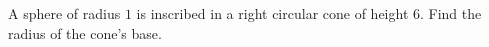 A sphere of radius $1$ is inscribed in a right circular cone of height $6$. Find the radius of the cone's base.
